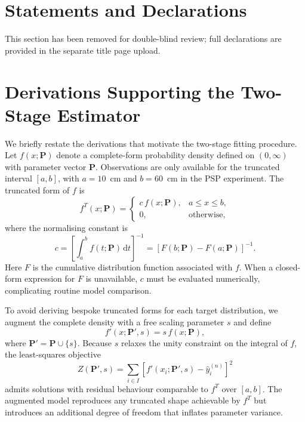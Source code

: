 \documentclass[12pt]{article}
\begin{document}

\section*{Statements and Declarations}
This section has been removed for double-blind review; full declarations are provided in the separate title page upload.

\appendix
\section{Derivations Supporting the Two-Stage Estimator}

We briefly restate the derivations that motivate the two-stage fitting procedure. Let $f(x; \bm{P})$ denote a complete-form probability density defined on $(0, \infty)$ with parameter vector $\bm{P}$. Observations are only available for the truncated interval $[a, b]$, with $a = 10$~cm and $b = 60$~cm in the PSP experiment. The truncated form of $f$ is
\begin{equation}
  f^{T}(x; \bm{P}) =
    \begin{cases}
      c \, f(x; \bm{P}), & a \leq x \leq b, \\
      0, & \text{otherwise},
    \end{cases}
    \label{eq:truncated-density}
\end{equation}
where the normalising constant is
\begin{equation}
  c = \left[\int_a^b f(t; \bm{P}) \,\mathrm{d}t\right]^{-1} = \left[F(b; \bm{P}) - F(a; \bm{P})\right]^{-1}.
\end{equation}
Here $F$ is the cumulative distribution function associated with $f$. When a closed-form expression for $F$ is unavailable, $c$ must be evaluated numerically, complicating routine model comparison.

To avoid deriving bespoke truncated forms for each target distribution, we augment the complete density with a free scaling parameter $s$ and define
\begin{equation}
  f'(x; \bm{P}', s) = s \, f(x; \bm{P}),
\end{equation}
where $\bm{P}' = \bm{P} \cup \{s\}$. Because $s$ relaxes the unity constraint on the integral of $f$, the least-squares objective
\begin{equation}
  Z(\bm{P}', s) = \sum_{i \in I} \left[f'(x_i; \bm{P}', s) - \hat{y}_i^{(n)}\right]^2
\end{equation}
admits solutions with residual behaviour comparable to $f^{T}$ over $[a, b]$. The augmented model reproduces any truncated shape achievable by $f^{T}$ but introduces an additional degree of freedom that inflates parameter variance.
\end{document}
